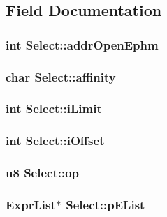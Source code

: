 \subsection{Field Documentation}
\subsubsection{\setlength{\rightskip}{0pt plus 5cm}int \bf{Select::addr\-Open\-Ephm}}\label{structSelect_bfe4b314dd53dff2facf11b3e3ff0c77}


\subsubsection{\setlength{\rightskip}{0pt plus 5cm}char \bf{Select::affinity}}\label{structSelect_0b098f41163fc5290c2abcd4b51a3c76}


\subsubsection{\setlength{\rightskip}{0pt plus 5cm}int \bf{Select::i\-Limit}}\label{structSelect_7b7b2f06c4f6c9bab6f5572c8da8d1ad}


\subsubsection{\setlength{\rightskip}{0pt plus 5cm}int \bf{Select::i\-Offset}}\label{structSelect_7ce8d7823a4299aad378dd532b11655b}


\subsubsection{\setlength{\rightskip}{0pt plus 5cm}\bf{u8} \bf{Select::op}}\label{structSelect_2ae6405a9fb01416a11ec28019096a02}


\subsubsection{\setlength{\rightskip}{0pt plus 5cm}\bf{Expr\-List}$\ast$ \bf{Select::p\-EList}}\label{structSelect_38db07372f532dba262831b524cfb852}


